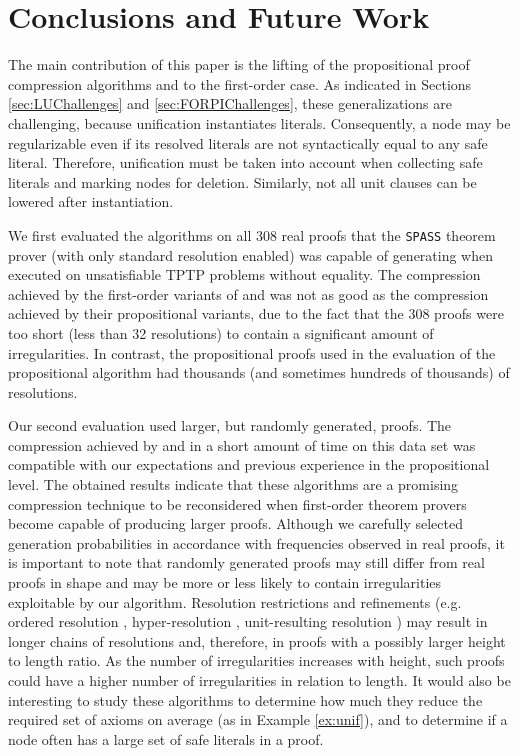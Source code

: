 \section{Conclusions and Future Work}\label{sec:conclusion}

The main contribution of this paper is the lifting of the propositional proof compression algorithms {\LowerUnits} and {\RPI} to the first-order case. 
As indicated in Sections \ref{sec:LUChallenges} and \ref{sec:FORPIChallenges}, these generalizations are challenging, because unification instantiates literals. 
Consequently, a node may be regularizable even if its resolved literals are not syntactically equal to any safe literal. 
Therefore, unification must be taken into account when collecting safe literals and marking nodes for deletion.
Similarly, not all unit clauses can be lowered after instantiation.

We first evaluated the algorithms on all 308 real proofs that the \texttt{SPASS} theorem prover (with only standard resolution enabled) was capable of generating when executed on unsatisfiable TPTP problems without equality. 
The compression achieved by the first-order variants of {\LowerUnits} and {\FORPI} was not as good as the compression achieved by their propositional variants, due to the fact that the 308 proofs were too short (less than 32 resolutions) to contain a significant amount of irregularities. 
In contrast, the propositional proofs used in the evaluation of the propositional {\RPI} algorithm had thousands (and sometimes hundreds of thousands) of resolutions. 

Our second evaluation used larger, but randomly generated, proofs. 
The compression achieved by {\GFOLU} and {\FORPI} in a short amount of time on this data set was compatible with our expectations and previous experience in the propositional level. 
The obtained results indicate that these algorithms are a promising compression technique to be reconsidered when first-order theorem provers become capable of producing larger proofs. 
Although we carefully selected generation probabilities in accordance with frequencies observed in real proofs, it is important to note that randomly generated proofs may still differ from real proofs in shape and may be more or less likely to contain irregularities exploitable by our algorithm. Resolution restrictions and refinements (e.g. ordered resolution %
\cite{hsiang1991proving,OrderedRes}, hyper-resolution \cite{HyperResolution,robinson1965automatic}, unit-resulting resolution \cite{UnitResultingResolution,prover9-mace4}) may result in longer chains of resolutions and, therefore, in proofs with a possibly larger height to length ratio. 
As the number of irregularities increases with height, such proofs could have a higher number of irregularities in relation to length.
It would also be interesting to study these algorithms to determine how much they reduce the required set of axioms on average (as in Example \ref{ex:unif}), and to determine if a node often has a large set of safe literals in a proof.

